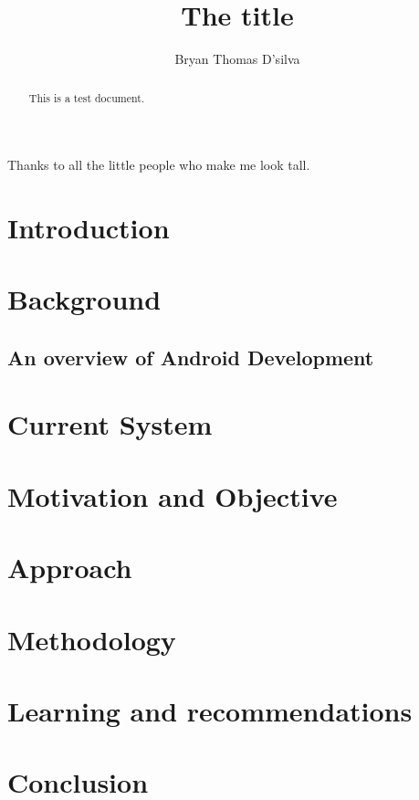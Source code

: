 \documentclass[12pt]{dalcsthesis}
\begin{document}
\macs  %
\title{The title}
\author{Bryan Thomas D'silva}



\nolistoftables
\nolistoffigures

\frontmatter

\begin{abstract}
This is a test document.
\end{abstract}

\begin{acknowledgements}
Thanks to all the little people who make me look tall.
\end{acknowledgements}

\mainmatter

\chapter{Introduction}
\chapter{Background}
\section{An overview of Android Development}
\chapter{Current System}
\chapter{Motivation and Objective}
\chapter{Approach}
\chapter{Methodology}
\chapter{Learning and recommendations}
\chapter{Conclusion}
\end{document}
